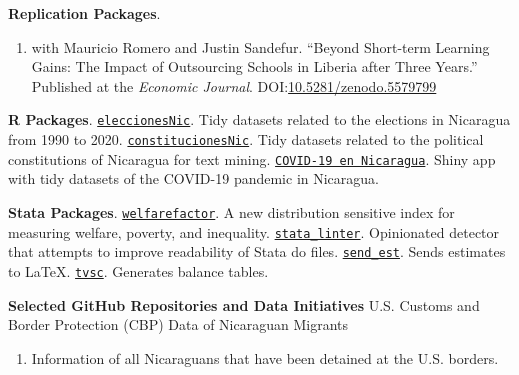 \documentclass[a4paper, 10pt]{article}
\renewenvironment{itemize}{
  \begin{list}{}
    { \setlength{\itemsep}{5pt}
      \setlength{\parsep}{0pt}
      \setlength{\topsep}{0pt}
      \setlength{\leftmargin}{0em} } }{
  \end{list}}
\begin{document}
\begin{itemize}
  \item \textbf{Replication Packages}.
  \begin{enumerate}[leftmargin=10pt, label={}, itemindent=-10pt, nosep]
    \item with Mauricio Romero and Justin Sandefur. ``Beyond Short-term Learning Gains: The Impact of Outsourcing Schools in Liberia after Three Years.'' Published at the \textit{Economic Journal}. DOI:\href{https://doi.org/10.5281/zenodo.5579799}{10.5281/zenodo.5579799}
  \end{enumerate}
  \item \textbf{R Packages}. \newline \texttt{\href{https://github.com/RRMaximiliano/eleccionesNic}{eleccionesNic}}. Tidy datasets related to the elections in Nicaragua from 1990 to 2020. \newline \texttt{\href{https://github.com/RRMaximiliano/constitucionesNic}{constitucionesNic}}. Tidy datasets related to the political constitutions of Nicaragua for text mining. \newline \texttt{\href{https://rrmaximiliano.shinyapps.io/covid-nicaragua/}{COVID-19 en Nicaragua}}. Shiny app with tidy datasets of the COVID-19 pandemic in Nicaragua.
  \item \textbf{Stata Packages}. \newline
  \texttt{\href{https://github.com/RRMaximiliano/welfarefactor}{welfarefactor}}.
  A new distribution sensitive index for measuring welfare, poverty, and
  inequality.
  \newline \texttt{\href{https://github.com/worldbank/stata-linter}
  {stata\_linter}}. Opinionated detector that attempts to improve readability of Stata do files. \newline \texttt{\href{https://github.com/RRMaximiliano/send\_est}{send\_est}}. Sends estimates to \LaTeX. \newline \texttt{\href{https://github.com/RRMaximiliano/tvsc}{tvsc}}. Generates balance tables.
   \item \textbf{Selected GitHub Repositories and Data Initiatives}
   \newline U.S. Customs and Border Protection (CBP) Data of Nicaraguan Migrants \href{https://github.com/RRMaximiliano/migrants_usbp}{\faGithub}
   \begin{enumerate}[label = {-}]
    \item Information of all Nicaraguans that have been detained at the U.S. borders.
   \end{enumerate}

\end{itemize}
\end{document}
